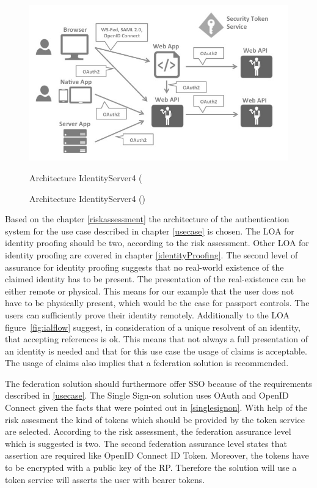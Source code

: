   \begin{figure}[h]
 	\centering
 	\includegraphics[width=0.9\linewidth]{images/architecture-identityserver}
 	\caption[Architecture IdentityServer4]{Architecture IdentityServer4 (\cite{Brock:2018:ID4}}
 	\caption{Architecture IdentityServer4 (\cite{Brock:2018:ID4})}
 	\label{fig:architecture-identityserver}
 \end{figure}

 Based on the chapter \ref{riskassessment} the architecture of the authentication system for the use case described in chapter \ref{usecase} is chosen. The LOA for identity proofing should be two, according to the risk assessment. Other LOA for identity proofing are covered in chapter \ref{identityProofing}. The second level of assurance for identity proofing suggests that no real-world existence of the claimed identity has to be present. The presentation of the real-existence can be either remote or physical. This means for our example that the user does not have to be physically present, which would be the case for passport controls. The users can sufficiently prove their identity remotely. Additionally to the LOA figure~\ref{fig:ialflow} suggest, in consideration of a unique resolvent of an identity, that accepting references is ok. This means that not always a full presentation of an identity is needed and that for this use case the usage of claims is acceptable. The usage of claims also implies that a federation solution is recommended. 
 
 The federation solution should furthermore offer SSO because of the requirements described in \ref{usecase}. The Single Sign-on solution uses OAuth and OpenID Connect given the facts that were pointed out in \ref{singlesignon}. With help of the risk assesment the kind of tokens which should be provided by the token service are selected. According to the risk assessment, the federation assurance level which is suggested is two. The second federation assurance level states that assertion are required like OpenID Connect ID Token. Moreover, the tokens have to be encrypted with a public key of the RP. Therefore the solution will use a token service will asserts the user with bearer tokens.
 
